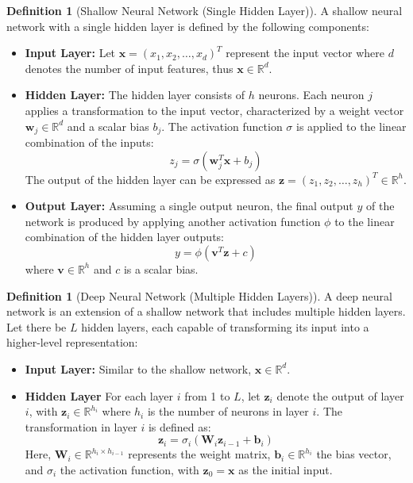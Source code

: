 \documentclass[11pt,a4paper]{article}
\theoremstyle{plain}
\theoremstyle{definition}
\newtheorem{definition}[theorem]{Definition}
\theoremstyle{remark}
\begin{document}
\begin{definition}[Shallow Neural Network (Single Hidden Layer)]

A shallow neural network with a single hidden layer is defined by the following components:

\begin{itemize}
  \item \textbf{Input Layer:} Let \(\mathbf{x} = (x_1, x_2, \ldots, x_d)^T\) represent the input vector where \(d\) denotes the number of input features, thus \(\mathbf{x} \in \mathbb{R}^d\).

  \item \textbf{Hidden Layer:} The hidden layer consists of \(h\) neurons. Each neuron \(j\) applies a transformation to the input vector, characterized by a weight vector \(\mathbf{w}_j \in \mathbb{R}^d\) and a scalar bias \(b_j\). The activation function \(\sigma\) is applied to the linear combination of the inputs:
    \[
    z_j = \sigma(\mathbf{w}_j^T \mathbf{x} + b_j)
    \]
    The output of the hidden layer can be expressed as \(\mathbf{z} = (z_1, z_2, \ldots, z_h)^T \in \mathbb{R}^h\).

  \item \textbf{Output Layer:} Assuming a single output neuron, the final output \(y\) of the network is produced by applying another activation function \(\phi\) to the linear combination of the hidden layer outputs:
    \[
    y = \phi(\mathbf{v}^T \mathbf{z} + c)
    \]
    where \(\mathbf{v} \in \mathbb{R}^h\) and \(c\) is a scalar bias.
\end{itemize}

\begin{definition}[Deep Neural Network (Multiple Hidden Layers)]

A deep neural network is an extension of a shallow network that includes multiple hidden layers. Let there be \(L\) hidden layers, each capable of transforming its input into a higher-level representation:

\begin{itemize}
    \item \textbf{Input Layer:} Similar to the shallow network, \(\mathbf{x} \in \mathbb{R}^d\).
    
    \item \textbf{Hidden Layer}  For each layer \(i\) from 1 to \(L\), let \(\mathbf{z}_i\) denote the output of layer \(i\), with \(\mathbf{z}_i \in \mathbb{R}^{h_i}\) where \(h_i\) is the number of neurons in layer \(i\). The transformation in layer \(i\) is defined as:
    \[
    \mathbf{z}_i = \sigma_i(\mathbf{W}_i \mathbf{z}_{i-1} + \mathbf{b}_i)
    \]
    Here, \(\mathbf{W}_i \in \mathbb{R}^{h_i \times h_{i-1}}\) represents the weight matrix, \(\mathbf{b}_i \in \mathbb{R}^{h_i}\) the bias vector, and \(\sigma_i\) the activation function, with \(\mathbf{z}_0 = \mathbf{x}\) as the initial input.


\end{itemize}
\end{definition}
\end{definition}
\end{document}
